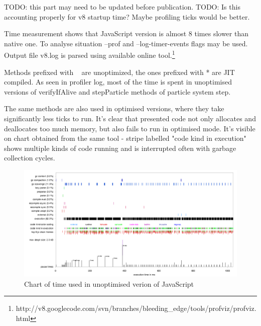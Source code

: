 TODO: this part may need to be updated before publication.
TODO: Is this accounting properly for v8 startup time? Maybe profiling ticks would be better.




Time measurement shows that JavaScript version is almost 8 times slower than native one. To analyse situation --prof and --log-timer-events flags may be used. Output file v8.log is parsed using available online tool.\footnote{http://v8.googlecode.com/svn/branches/bleeding\_edge/tools/profviz/profviz.html}



Methods prefixed with ~ are unoptimized, the ones prefixed with * are JIT compiled. As seen in profiler log, most of the time is spent in unoptimised versions of verifyIfAlive and stepParticle methods of particle system step.



The same methods are also used in optimised versions, where they take significantly less ticks to run. It's clear that presented code not only allocates and deallocates too much memory, but also fails to run in optimised mode. It's visible on chart obtained from the same tool - stripe labelled "code kind in execution" shows multiple kinds of code running and is interrupted often with garbage collection cycles.

\begin{figure}[h!]
  \caption{Chart of time used in unoptimised verion of JavaScript}
  \label{img:particles1profile}
  \centering
	\includegraphics[width=16cm]{particles/particles1-profile.png}
\end{figure}

